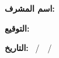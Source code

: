 \noindent\textbf{اسم المشرف:} \thesisSupervisorAR

\vspace{36pt}
\noindent\textbf{التوقيع:} \makebox[8cm]{\dotfill}

\vspace{30pt}
\noindent\textbf{التاريخ:} \makebox[2.2cm]{\dotfill}\ /\ \makebox[2.2cm]{\dotfill}\ /\ \makebox[2.2cm]{\dotfill}

\clearpage
